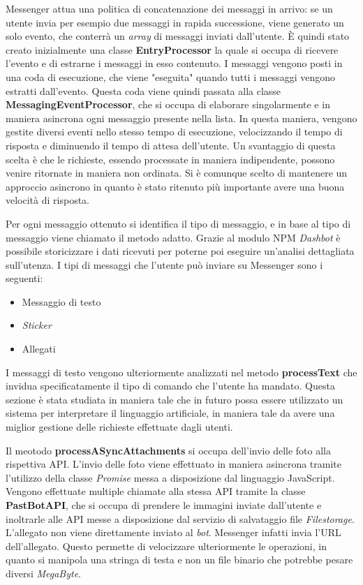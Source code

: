 Messenger attua una politica di concatenazione dei messaggi in arrivo: se un
utente invia per esempio due messaggi in rapida successione, viene generato un
solo evento, che conterrà un \textit{array} di messaggi inviati dall'utente. È
quindi stato creato inizialmente una classe \textbf{EntryProcessor} la quale si
occupa di ricevere l'evento e di estrarne i messaggi in esso contenuto. I
messaggi vengono posti in una coda di esecuzione, che viene "eseguita" quando
tutti i messaggi vengono estratti dall'evento.
Questa coda viene quindi passata alla classe \textbf{MessagingEventProcessor},
che si occupa di elaborare singolarmente e in maniera asincrona ogni messaggio
presente nella lista. In questa maniera, vengono gestite diversi eventi nello
stesso tempo di esecuzione, velocizzando il tempo di risposta e diminuendo il
tempo di attesa dell'utente. Un svantaggio di questa scelta è che le richieste,
essendo processate in maniera indipendente, possono venire ritornate in maniera
non ordinata. Si è comunque scelto di mantenere un approccio asincrono in
quanto è stato ritenuto più importante avere una buona velocità di risposta.

Per ogni messaggio ottenuto si identifica il tipo di messaggio, e in base al
tipo di messaggio viene chiamato il metodo adatto. Grazie al modulo NPM
\textit{Dashbot} è possibile storicizzare i dati ricevuti per poterne poi
eseguire un'analisi dettagliata sull'utenza.
I tipi di messaggi che l'utente può inviare su Messenger sono i seguenti:
\begin{itemize}
  \item Messaggio di testo
  \item \textit{Sticker}
  \item Allegati
\end{itemize}
I messaggi di testo vengono ulteriormente analizzati nel metodo
\textbf{processText} che invidua specificatamente il tipo di comando che
l'utente ha mandato. Questa sezione è stata studiata in maniera tale che in
futuro possa essere utilizzato un sistema per interpretare il linguaggio
artificiale, in maniera tale da avere una miglior gestione delle richieste
effettuate dagli utenti.

Il meotodo \textbf{processASyncAttachments} si occupa dell'invio delle foto
alla rispettiva API. L'invio delle foto viene effettuato in maniera asincrona
tramite l'utilizzo della classe \textit{Promise} messa a disposizione dal
linguaggio JavaScript. Vengono effettuate multiple chiamate alla stessa API
tramite la classe \textbf{PastBotAPI}, che si occupa di prendere le immagini
inviate dall'utente e inoltrarle alle API messe a disposizione dal servizio di
salvataggio file \textit{Filestorage}.
L'allegato non viene direttamente inviato al \textit{bot}. Messenger infatti
invia l'URL
dell'allegato. Questo permette di velocizzare ulteriormente le operazioni, in
quanto si manipola una stringa di testa e non un file binario che potrebbe
pesare diversi \textit{MegaByte}.

